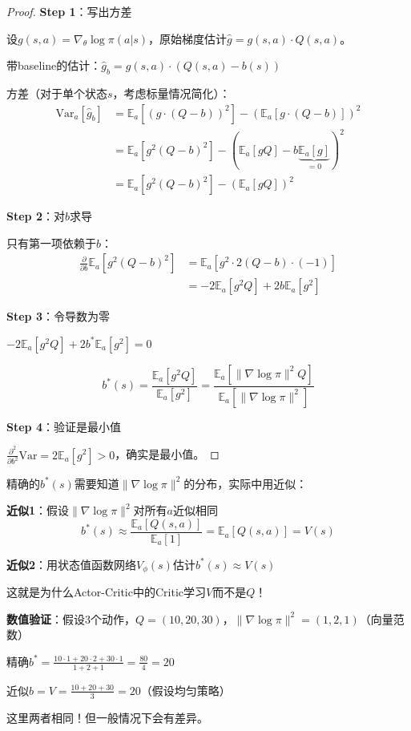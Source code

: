 \documentclass[11pt,a4paper]{article}
\theoremstyle{definition}
\begin{document}
\begin{proof}
\textbf{Step 1}：写出方差

设$g(s,a) = \nabla_\theta \log \pi(a|s)$，原始梯度估计$\hat{g} = g(s,a) \cdot Q(s,a)$。

带baseline的估计：$\hat{g}_b = g(s,a) \cdot (Q(s,a) - b(s))$

方差（对于单个状态$s$，考虑标量情况简化）：
\begin{align*}
\text{Var}_a[\hat{g}_b] &= \mathbb{E}_a[(g \cdot (Q - b))^2] - (\mathbb{E}_a[g \cdot (Q-b)])^2 \\
&= \mathbb{E}_a[g^2 (Q-b)^2] - (\mathbb{E}_a[g Q] - b\underbrace{\mathbb{E}_a[g]}_{=0})^2 \\
&= \mathbb{E}_a[g^2 (Q-b)^2] - (\mathbb{E}_a[g Q])^2
\end{align*}

\textbf{Step 2}：对$b$求导

只有第一项依赖于$b$：
\begin{align*}
\frac{\partial}{\partial b} \mathbb{E}_a[g^2(Q-b)^2] &= \mathbb{E}_a\left[g^2 \cdot 2(Q-b) \cdot (-1)\right] \\
&= -2\mathbb{E}_a[g^2 Q] + 2b \mathbb{E}_a[g^2]
\end{align*}

\textbf{Step 3}：令导数为零

$-2\mathbb{E}_a[g^2 Q] + 2b^* \mathbb{E}_a[g^2] = 0$

\[
b^*(s) = \frac{\mathbb{E}_a[g^2 Q]}{\mathbb{E}_a[g^2]} = \frac{\mathbb{E}_a[\|\nabla \log \pi\|^2 Q]}{\mathbb{E}_a[\|\nabla \log \pi\|^2]}
\]

\textbf{Step 4}：验证是最小值

$\frac{\partial^2}{\partial b^2} \text{Var} = 2\mathbb{E}_a[g^2] > 0$，确实是最小值。
\end{proof}

\begin{calculation}[最优Baseline的近似]
精确的$b^*(s)$需要知道$\|\nabla \log \pi\|^2$的分布，实际中用近似：

\textbf{近似1}：假设$\|\nabla \log \pi\|^2$对所有$a$近似相同
\[
b^*(s) \approx \frac{\mathbb{E}_a[Q(s,a)]}{\mathbb{E}_a[1]} = \mathbb{E}_a[Q(s,a)] = V(s)
\]

\textbf{近似2}：用状态值函数网络$V_\phi(s)$估计$b^*(s) \approx V(s)$

这就是为什么Actor-Critic中的Critic学习$V$而不是$Q$！

\textbf{数值验证}：假设3个动作，$Q = (10, 20, 30)$，$\|\nabla \log \pi\|^2 = (1, 2, 1)$（向量范数）

精确$b^* = \frac{10 \cdot 1 + 20 \cdot 2 + 30 \cdot 1}{1 + 2 + 1} = \frac{80}{4} = 20$

近似$b = V = \frac{10 + 20 + 30}{3} = 20$（假设均匀策略）

这里两者相同！但一般情况下会有差异。
\end{calculation}
\end{document}
